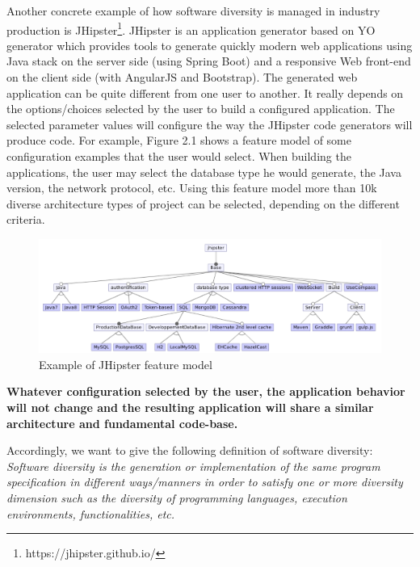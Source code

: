 Another concrete example of how software diversity is managed in industry production is JHipster\footnote{https://jhipster.github.io/}. JHipster is an application generator based on YO generator which provides tools to generate quickly modern web applications using Java stack on the server side (using Spring Boot) and a responsive Web front-end on the client side (with AngularJS and Bootstrap).
The generated web application can be quite different from one user to another. It really depends on the options/choices selected by the user to build a configured application. The selected parameter values will configure the way the JHipster code generators will produce code. 
For example, Figure 2.1 shows a feature model of some configuration examples that the user would select. When building the applications, the user may select the database type he would generate, the Java version, the network protocol, etc. 
Using this feature model more than 10k diverse architecture types of project can be selected, depending on the different criteria.
\begin{figure}[h]
	\center
	\includegraphics[scale=0.65]{Background/fig/jhipster}
	\caption{Example of JHipster feature model}
\end{figure}

\textbf{Whatever configuration selected by the user, the application behavior will not change and the resulting application will share a similar architecture and fundamental code-base.}

Accordingly, we want to give the following definition of software diversity: 
\textit{Software diversity is the generation or implementation of the same program specification in different ways/manners in order to satisfy one or more diversity dimension such as the diversity of programming languages, execution environments, functionalities, etc.}



